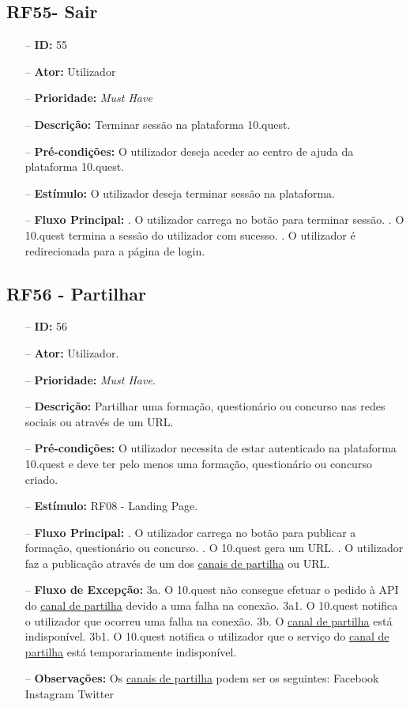 \subsection{RF55- Sair}
\begin{itemize}
	\item[--] \textbf{ID:} 55
	\item[--]  \textbf{Ator:} Utilizador
	\item[--]  \textbf{Prioridade:} \textit{Must Have}
	\item[--]  \textbf{Descrição:} Terminar sessão na plataforma 10.quest.
	\item[--]  \textbf{Pré-condições:} O utilizador deseja aceder ao centro de ajuda da plataforma 10.quest.
	\item[--]  \textbf{Estímulo:} O utilizador deseja terminar sessão na plataforma.
	\item[--]  \textbf{Fluxo Principal:} 
	. O utilizador carrega no botão para terminar sessão.
	. O 10.quest termina a sessão do utilizador com sucesso.
	. O utilizador é redirecionada para a página de login.
\end{itemize}
\newpage

\subsection{RF56 - Partilhar}
\begin{itemize}
	\item[--] \textbf{ID:} 56
	\item[--]  \textbf{Ator:} Utilizador.
	\item[--]  \textbf{Prioridade:} \textit{Must Have}.
	\item[--]  \textbf{Descrição:} Partilhar uma formação, questionário ou concurso nas redes sociais ou através de um URL.
	\item[--]  \textbf{Pré-condições:} O utilizador necessita de estar autenticado na plataforma 10.quest e deve ter pelo menos uma formação, questionário ou concurso criado.
	\item[--]  \textbf{Estímulo:} RF08 - Landing Page.
	\item[--]  \textbf{Fluxo Principal:} 
	. O utilizador carrega no botão para publicar a formação, questionário ou concurso.
	. O 10.quest gera um URL.
	. O utilizador faz a publicação através de um dos \underline{canais de partilha} ou URL.
	\item[--]  \textbf{Fluxo de Excepção:} 
	\subitem 3a. O 10.quest não consegue efetuar o pedido à API do \underline{canal de partilha} devido a uma falha na conexão.
	\subitem 3a1. O 10.quest notifica o utilizador que ocorreu uma falha na conexão.
	\subitem 3b. O \underline{canal de partilha} está indisponível.
	\subitem 3b1. O 10.quest notifica o utilizador que o serviço do \underline{canal de partilha} está temporariamente indisponível.
	\item[--]  \textbf{Observações:} Os \underline{canais de partilha} podem ser os seguintes:
		\subitem Facebook
		\subitem Instagram
		\subitem Twitter
\end{itemize}
\newpage

